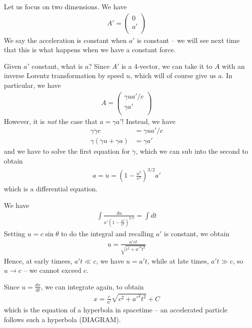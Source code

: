 \documentclass{../../template/note}
\begin{document}
    Let us focus on two dimensions. We have
    \begin{align*}
        A' = \begin{pmatrix}
            0 \\
            a' \\
        \end{pmatrix}
    \end{align*}
    We say the acceleration is constant when $a'$ is constant -- we will see next time that this is what happens when we have a constant force.

    Given $a'$ constant, what is $a$? Since $A'$ is a 4-vector, we can take it to $A$ with an inverse Lorentz transformation by speed $u$, which will of course give us $a$. In particular, we have
    \begin{align*}
        A = \begin{pmatrix}
            \gamma ua'/c \\
            \gamma a' \\
        \end{pmatrix}
    \end{align*}
    However, it is \emph{not} the case that $a = \gamma a'$! Instead, we have
    \begin{align*}
        \gamma \dot \gamma c &= \gamma ua'/c \\
        \gamma(\dot \gamma u + \gamma a) &= \gamma a'
    \end{align*}
    and we have to solve the first equation for $\dot \gamma$, which we can sub into the second to obtain
    \begin{align*}
        a = \dot u = \left(1-\frac{u^2}{c^2}\right)^{3/2}a'
    \end{align*}
    which is a differential equation.   


    We have
    \begin{align*}
        \int \frac{du}{a' \left(1-\frac{u^2}{c^2}\right)^{3/2}} = \int dt
    \end{align*}
    Setting \(u = c \sin \theta\) to do the integral and recalling \(a'\) is constant, we obtain
    \begin{align*}
        u = \frac{a'ct}{\sqrt{c^2+a'^2t^2}}
    \end{align*}
    Hence, at early timees, \(a't \ll c\), we have \(u = a't\), while at late times, \(a't \gg c\), so \(u \to c\) -- we cannot exceed \(c\).

    Since \(u = \frac{dx}{dt}\), we can integrate again, to obtain
    \begin{align*}
        x = \frac c {a'} \sqrt{c^2+a'^2t^2} + C
    \end{align*}
    which is the equation of a hyperbola in spacetime -- an accelerated particle follows such a hyperbola (DIAGRAM).
\end{document}
